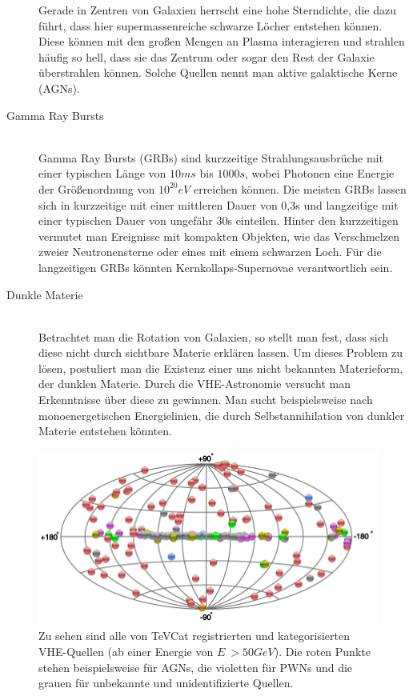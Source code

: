 \begin{description}
Gerade in Zentren von Galaxien herrscht eine hohe Sterndichte, die dazu führt, dass hier supermassenreiche schwarze Löcher entstehen können. Diese können mit den großen Mengen an Plasma interagieren und strahlen häufig so hell, dass sie das Zentrum oder sogar den Rest der Galaxie überstrahlen können. Solche Quellen nennt man aktive galaktische Kerne (AGNs).
\item[Gamma Ray Bursts]\hfill \\
Gamma Ray Bursts (GRBs) sind kurzzeitige Strahlungsausbrüche mit einer typischen Länge von $10\unit{ms}$ bis $1000\unit{s}$, wobei Photonen eine Energie der Größenordnung von $10^{20}\unit{eV}$ \cite{tevstat} erreichen können. %
Die meisten GRBs lassen sich in kurzzeitige mit einer mittleren Dauer von 0,3s und langzeitige mit einer typischen Dauer von ungefähr 30s einteilen. Hinter den kurzzeitigen vermutet man Ereignisse mit kompakten Objekten, wie das Verschmelzen zweier Neutronensterne oder eines mit einem schwarzen Loch. Für die langzeitigen GRBs könnten Kernkollaps-Supernovae verantwortlich sein.
\item[Dunkle Materie]\hfill \\
Betrachtet man die Rotation von Galaxien, so stellt man fest, dass sich diese nicht durch sichtbare Materie erklären lassen. Um dieses Problem zu lösen, postuliert man die Existenz einer uns nicht bekannten Materieform, der dunklen Materie. Durch die VHE-Astronomie versucht man Erkenntnisse über diese zu gewinnen. Man sucht beispielsweise nach monoenergetischen Energielinien, die durch Selbstannihilation von dunkler Materie entstehen könnten.
\end{description}

\begin{figure}[htbp]
\centering
\includegraphics[width=\textwidth]{Images/tevcat.png}
\caption{Zu sehen sind alle von TeVCat registrierten und kategorisierten VHE-Quellen (ab einer Energie von $E~>50\unit{GeV}$\cite{TeVCat2}). Die roten Punkte stehen beispielsweise für AGNs, die violetten für PWNs und die grauen für unbekannte und unidentifizierte Quellen. \cite{TevCat}}
\label{img:tevcat}
\end{figure}


